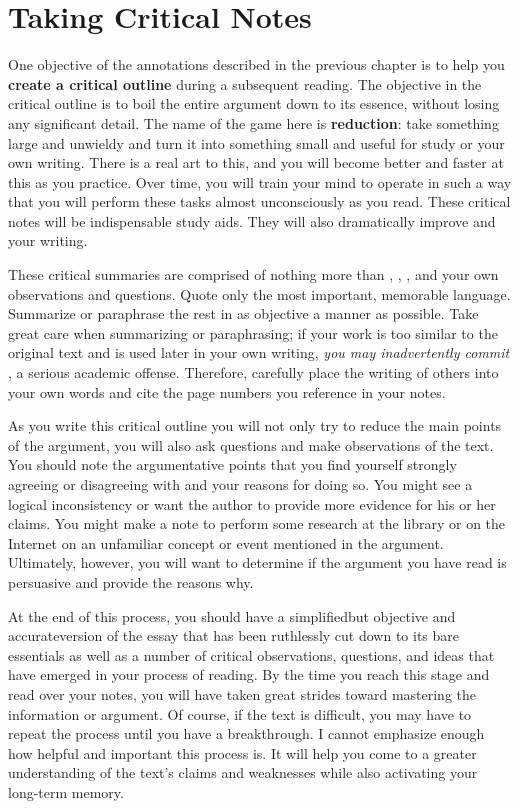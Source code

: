 \section{Taking Critical Notes}

One objective of the annotations described in the previous chapter is to help you \textbf{create a
critical outline} during a subsequent reading. The objective in the critical
outline is to boil the entire argument down to its essence, without losing any
significant detail. The name of the game here is \textbf{reduction}: take
something large and unwieldy and turn it into something small and useful for
study or your own writing. There is a real art to this, and you will become
better and faster at this as you practice. Over time, you will train your mind
to operate in such a way that you will perform these tasks almost unconsciously
as you read. These critical notes will be indispensable study aids. They will
also dramatically improve and your writing.

These critical summaries are comprised of nothing more than \hyperlink{summary}{\color{Ahrenge}{summary}}, \hyperlink{paraphrase}{\color{Ahrenge}{paraphrase}}, \hyperlink{quotation}{\color{Ahrenge}{quotation}}, and your own observations and
questions. Quote only the most important, memorable language. Summarize or
paraphrase the rest in as objective a manner as possible. Take great care when
summarizing or paraphrasing; if your work is too similar to the original text
and is used later in your own writing, \emph{you may inadvertently commit
\hyperlink{plagiarism}{\color{Ahrenge}{plagiarism}}}, a serious academic
offense. Therefore, carefully place the writing of others into your own words
and cite the page numbers you reference in your notes.

As you write this critical outline you will not only try to reduce the main
points of the argument, you will also ask questions and make observations of the
text. You should note the argumentative points that you find yourself strongly
agreeing or disagreeing with and your reasons for doing so. You might see a
logical inconsistency or want the author to provide more evidence for his or her
claims. You might make a note to perform some research at the library or on the
Internet on an unfamiliar concept or event mentioned in the argument.
Ultimately, however, you will want to determine if the argument you have read is
persuasive and provide the reasons why.

At the end of this process, you should have a simplified\textemdash but
objective and accurate\textemdash version of the essay that has been ruthlessly
cut down to its bare essentials as well as a number of critical observations,
questions, and ideas that have emerged in your process of reading. By the time
you reach this stage and read over your notes, you will have taken great strides
toward mastering the information or argument. Of course, if the text is difficult, you may have to repeat the process until you have a breakthrough. I cannot emphasize enough how helpful and important this process is. It will help you come to a greater understanding of the text’s claims and weaknesses while also activating your long-term memory. 

